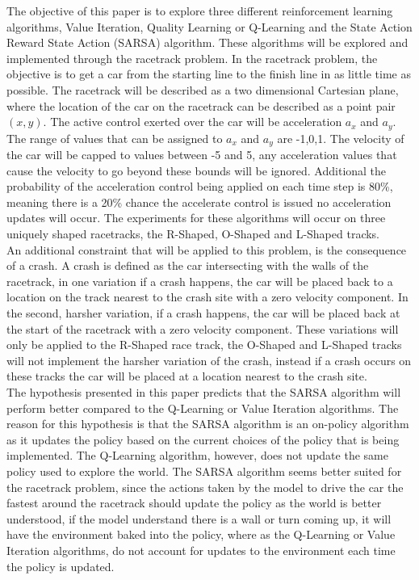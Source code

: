 \documentclass[twoside,11pt]{article}
\begin{document}
\hspace*{10mm} The objective of this paper is to explore three different reinforcement learning algorithms, Value Iteration, Quality Learning or Q-Learning and the State Action Reward State Action (SARSA) algorithm. These algorithms will be explored and implemented through the racetrack problem. In the racetrack problem, the objective is to get a car from the starting line to the finish line in as little time as possible. The racetrack will be described as a two dimensional Cartesian plane, where the location of the car on the racetrack can be described as a point pair $(x,y)$. The active control exerted over the car will be acceleration $a_x$ and $a_y$. The range of values that can be assigned to $a_x$ and $a_y$ are -1,0,1. The velocity of the car will be capped to values between -5 and 5, any acceleration values that cause the velocity to go beyond these bounds will be ignored. Additional the probability of the acceleration control being applied on each time step is 80\%, meaning there is a 20\% chance the accelerate control is issued no acceleration updates will occur. The experiments for these algorithms will occur on three uniquely shaped racetracks, the R-Shaped, O-Shaped and L-Shaped tracks.\\ 
\hspace*{10mm} An additional constraint that will be applied to this problem, is the consequence of a crash. A crash is defined as the car intersecting with the walls of the racetrack, in one variation if a crash happens, the car will be placed back to a location on the track nearest to the crash site with a zero velocity component. In the second, harsher variation, if a crash happens, the car will be placed back at the start of the racetrack with a zero velocity component. These variations will only be applied to the R-Shaped race track, the O-Shaped and L-Shaped tracks will not implement the harsher variation of the crash, instead if a crash occurs on these tracks the car will be placed at a location nearest to the crash site. \\
\hspace*{10mm} The hypothesis presented in this paper predicts that the SARSA algorithm will perform better compared to the Q-Learning or Value Iteration algorithms. The reason for this hypothesis is that the SARSA algorithm is an on-policy algorithm as it updates the policy based on the current choices of the policy that is being implemented. The Q-Learning algorithm, however, does not update the same policy used to explore the world. The SARSA algorithm seems better suited for the racetrack problem, since the actions taken by the model to drive the car the fastest around the racetrack should update the policy as the world is better understood, if the model understand there is a wall or turn coming up, it will have the environment baked into the policy, where as the Q-Learning or Value Iteration algorithms, do not account for updates to the environment each time the policy is updated.\\ 
\end{document}

